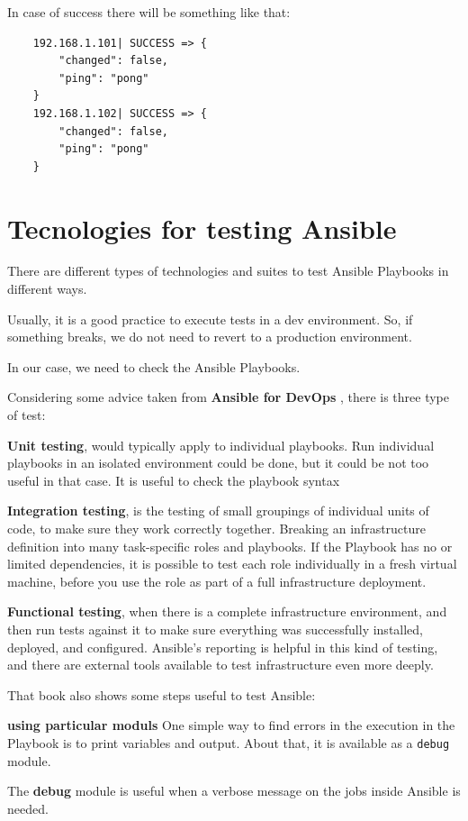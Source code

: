 \documentclass[12pt,a4paper,openright,twoside]{book}
\begin{document}
In case of success there will be something like that:
\begin{lstlisting}
    192.168.1.101| SUCCESS => {
        "changed": false, 
        "ping": "pong"
    }
    192.168.1.102| SUCCESS => {
        "changed": false, 
        "ping": "pong"
    }
\end{lstlisting}

\section{Tecnologies for testing Ansible}
There are different types of technologies and suites to test Ansible Playbooks in different ways.


Usually, it is a good practice to execute tests in a dev environment. So, if something breaks, we do not need to revert to a production environment.


In our case, we need to check the Ansible Playbooks.

Considering some advice taken from \textbf{Ansible for DevOps} \cite{ansibleForDevOps}, there is three type of test:

\textbf{Unit testing}, would typically apply to individual playbooks.
Run individual playbooks in an isolated environment could be done, but it could be not too useful in that case. It is useful to check the playbook syntax

\textbf{Integration testing}, is the testing of small groupings of individual units of code, to make sure they work correctly together.
Breaking an infrastructure definition into many task-specific roles and playbooks. If the Playbook has no or limited dependencies, it is possible to test each role individually in a fresh virtual machine, before you use the role as part of a full infrastructure deployment.

\textbf{Functional testing}, when there is a complete infrastructure environment, and then run tests against it to make sure everything was successfully installed, deployed, and configured. Ansible's reporting is helpful in this kind of testing, and there are external tools available to test infrastructure even more deeply.

That book also shows some steps useful to test Ansible:

\textbf{using particular moduls}
One simple way to find errors in the execution in the Playbook is to print variables and output. About that, it is available as a \texttt{debug} module.


The \textbf{debug} module is useful when a verbose message on the jobs inside Ansible is needed.
\end{document}
